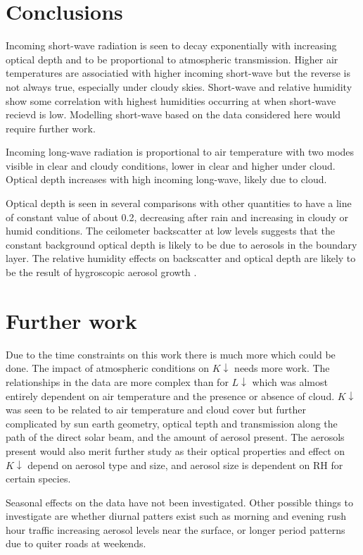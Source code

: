 \documentclass[a4paper,titlepage, twoside]{report}
\newcommand\Kdown{K\!\!\downarrow}
\newcommand\Ldown{L\!\!\downarrow}
\begin{document}
\section{Conclusions}
Incoming short-wave radiation is seen to decay exponentially with increasing optical depth and to be proportional to atmospheric transmission. Higher air temperatures are associatied with higher incoming short-wave but the reverse is not always true, especially under cloudy skies. Short-wave and relative humidity show some correlation with highest humidities occurring at when short-wave recievd is low.  Modelling short-wave based on the data considered here would require further work.

Incoming long-wave radiation is proportional to air temperature with two modes visible in clear and cloudy conditions, lower in clear and higher under cloud.  Optical depth increases with high incoming long-wave, likely due to cloud. 

Optical depth is seen in several comparisons with other quantities to have a line of constant value of about 0.2, decreasing after rain and increasing in cloudy or humid conditions. The ceilometer backscatter at low levels suggests that the constant background optical depth is likely to be due to aerosols in the boundary layer. The relative humidity effects on backscatter and optical depth are likely to be the result of hygroscopic aerosol growth \parencite{gibert,randriamiarisoa}.

\section{Further work}
Due to the time constraints on this work there is much more which could be done. The impact of atmospheric conditions on $\Kdown$ needs more work. The relationships in the data are more complex than for $\Ldown$ which was almost entirely dependent on air temperature and the presence or absence of cloud. $\Kdown$ was seen to be related to air temperature and cloud cover but further complicated by sun earth geometry, optical tepth and transmission along the path of the direct solar beam, and the amount of aerosol present. The aerosols present would also merit further study as their optical properties and effect on $\Kdown$ depend on aerosol type and size, and aerosol size is dependent on RH for certain species.

Seasonal effects on the data have not been investigated. Other possible things to investigate are whether diurnal patters exist such as morning and evening rush hour traffic increasing aerosol levels near the surface, or longer period patterns due to quiter roads at weekends.
\end{document}

